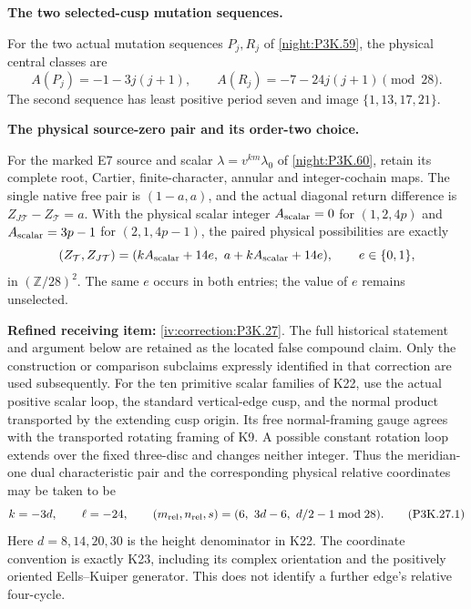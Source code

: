 \begin{proposition}\hypertarget{tag-01UR}{}\label{iv:correction:P3K.59}

\textbf{The two selected-cusp mutation sequences.}\par
For the two actual mutation sequences
\(P_j,R_j\) of \cref{night:P3K.59}, the physical
central classes are
\[
 A(P_j)=-1-3j(j+1),\qquad
 A(R_j)=-7-24j(j+1)\pmod{28}.
\]
The second sequence has least positive period seven
and image \(\{1,13,17,21\}\).
\end{proposition}

\begin{proposition}\hypertarget{tag-01UT}{}\label{iv:correction:P3K.60}

\textbf{The physical source-zero pair and its order-two choice.}\par
For the marked E7 source and scalar
\(\lambda=v^{km}\lambda_0\) of \cref{night:P3K.60},
retain its complete root, Cartier, finite-character,
annular and integer-cochain maps. The single native
free pair is \((1-a,a)\), and the actual diagonal
return difference is \(Z_{J\mathcal T}-Z_{\mathcal T}=a\).
With the physical scalar integer
\(A_{\rm scalar}=0\) for \((1,2,4p)\) and
\(A_{\rm scalar}=3p-1\) for \((2,1,4p-1)\), the
paired physical possibilities are exactly
\[
 (Z_{\mathcal T},Z_{J\mathcal T})=
 (kA_{\rm scalar}+14e,\ a+kA_{\rm scalar}+14e),
 \qquad e\in\{0,1\},
\]
in \((\mathbb Z/28)^2\). The same \(e\) occurs in
both entries; the value of \(e\) remains unselected.
\end{proposition}

\begin{theorem}\hypertarget{tag-02U7}{}\label{night:P3K.27}

\par\noindent\textbf{Refined receiving item:} \cref{iv:correction:P3K.27}. The full historical statement and argument below are retained as the located false compound claim. Only the construction or comparison subclaims expressly identified in that correction are used subsequently.
For the ten primitive scalar families of K22, use the actual
positive scalar loop, the standard vertical-edge cusp, and the
normal product transported by the extending cusp origin. Its
free normal-framing gauge agrees with the transported rotating
framing of K9. A possible constant rotation loop extends over
the fixed three-disc and changes neither integer. Thus the
meridian-one dual characteristic pair and the corresponding physical relative
coordinates may be taken to be
\[
       k=-3d,\qquad \ell=-24,\qquad
       (m_{\rm rel},n_{\rm rel},s)
             =(6,\ 3d-6,\ d/2-1\bmod28).
                                                        \tag{P3K.27.1}
\]
Here \(d=8,14,20,30\) is the height denominator in K22. The
coordinate convention is exactly K23, including its complex
orientation and the positively oriented Eells--Kuiper generator.
This does not identify a further edge's relative four-cycle.
\end{theorem}

